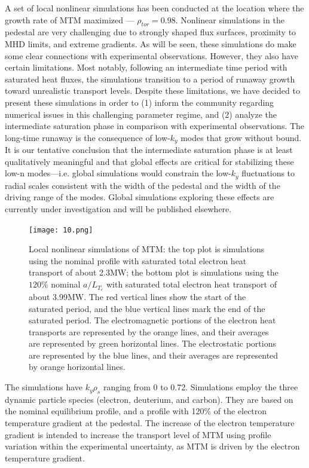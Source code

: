 \documentclass[
 aip,
 amsmath,amssymb,
 reprint
]{revtex4-1}
\begin{document}
A set of local nonlinear simulations has been conducted at the location where the growth rate of MTM maximized --- $\rho_{tor}=0.98$. Nonlinear simulations in the pedestal are very challenging due to strongly shaped flux surfaces, proximity to MHD limits, and extreme gradients.  As will be seen, these simulations do make some clear connections with experimental observations.  However, they also have certain limitations.  Most notably, following an intermediate time period with saturated heat fluxes, the simulations transition to a period of runaway growth toward unrealistic transport levels.  Despite these limitations, we have decided to present these simulations in order to (1) inform the community regarding numerical issues in this challenging parameter regime, and (2) analyze the intermediate saturation phase in comparison with experimental observations.  The long-time runaway is the consequence of low-$k_y$ modes that grow without bound.  It is our tentative conclusion that the intermediate saturation phase is at least qualitatively meaningful and that global effects are critical for stabilizing these low-n modes---i.e. global simulations would constrain the low-$k_y$ fluctuations to radial scales consistent with the width of the pedestal and the width of the driving range of the modes.  Global simulations exploring these effects are currently under investigation and will be published elsewhere.    

\begin{figure}[ht]
        \texttt{[image: 10.png]}
        \centering
        \caption[font=5]{Local nonlinear simulations of MTM: the top plot is simulations using the nominal profile with saturated total electron heat transport of about 2.3MW; the bottom plot is simulations using the $120\%$ nominal $a/L_{T_e}$ with saturated total electron heat transport of about 3.99MW. The red vertical lines show the start of the saturated period, and the blue vertical lines mark the end of the saturated period. 
        The electromagnetic portions of the electron heat transports are represented by the orange lines, and their averages are represented by green horizontal lines. The electrostatic portions are represented by the blue lines, and their averages are represented by orange horizontal lines. }
        \label{fig:time_trace}
\end{figure}

The simulations have $k_y\rho_s$ ranging from 0 to 0.72. 
Simulations employ the three dynamic particle species (electron, deuterium, and carbon). They are based on the nominal equilibrium profile, and a profile with 120\% of the electron temperature gradient at the pedestal. The increase of the electron temperature gradient is intended to increase the transport level of MTM using profile variation within the experimental uncertainty, as MTM is driven by the electron temperature gradient.  
\end{document}
